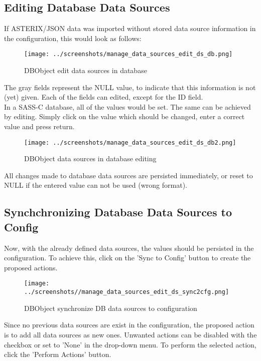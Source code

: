 \subsection{Editing Database Data Sources}

If ASTERIX/JSON data was imported without stored data source information in the configuration, this would look as follows:

\begin{figure}[H]
  \center
    \texttt{[image: ../screenshots/manage\_data\_sources\_edit\_ds\_db.png]}
  \caption{DBObject edit data sources in database}
\end{figure}

The gray fields represent the NULL value, to indicate that this information is not (yet) given. Each of the fields can edited, except for the ID field. \\

In a SASS-C database, all of the values would be set. The same can be achieved by editing. Simply click on the value which should be changed, enter a correct value and press return. \\

\begin{figure}[H]
  \center
    \texttt{[image: ../screenshots/manage\_data\_sources\_edit\_ds\_db2.png]}
  \caption{DBObject data sources in database editing}
\end{figure}

All changes made to database data sources are persisted immediately, or reset to NULL if the entered value can not be used (wrong format).

\subsection{Synchchronizing Database Data Sources to Config}

Now, with the already defined data sources, the values should be persisted in the configuration. To achieve this, click on the 'Sync to Config' button to create the proposed actions.

\begin{figure}[H]
  \center
    \texttt{[image: ../screenshots//manage\_data\_sources\_edit\_ds\_sync2cfg.png]}
  \caption{DBObject synchronize DB data sources to configuration }
\end{figure}

Since no previous data sources are exist in the configuration, the proposed action is to add all data sources as new ones. Unwanted actions can be disabled with the checkbox or set to 'None' in the drop-down menu. To perform the selected action, click the 'Perform Actions' button.

